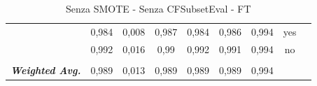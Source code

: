 \begin{table}[htbp]
{\begin{tabular}{rrrrrrrrr}
			\multicolumn{1}{c}{} & \multicolumn{1}{c}{0,984} & \multicolumn{1}{c}{0,008} & \multicolumn{1}{c}{0,987} & \multicolumn{1}{c}{0,984} & \multicolumn{1}{c}{0,986} & \multicolumn{1}{c}{0,994} & \multicolumn{1}{c}{yes} &  \\
			\multicolumn{1}{c}{} & \multicolumn{1}{c}{0,992} & \multicolumn{1}{c}{0,016} & \multicolumn{1}{c}{0,99} & \multicolumn{1}{c}{0,992} & \multicolumn{1}{c}{0,991} & \multicolumn{1}{c}{0,994} & \multicolumn{1}{c}{no} &  \\
			\multicolumn{1}{c}{} & \multicolumn{1}{c}{} & \multicolumn{1}{c}{} & \multicolumn{1}{c}{} & \multicolumn{1}{c}{} & \multicolumn{1}{c}{} & \multicolumn{1}{c}{} & \multicolumn{1}{c}{} &  \\
			\multicolumn{1}{c}{\textit{\textbf{Weighted Avg.}}} & \multicolumn{1}{c}{0,989} & \multicolumn{1}{c}{0,013} & \multicolumn{1}{c}{0,989} & \multicolumn{1}{c}{0,989} & \multicolumn{1}{c}{0,989} & \multicolumn{1}{c}{0,994} & \multicolumn{1}{c}{} &  \\
		\end{tabular}%
	}
	\label{tab:FT}%
	\caption{ Senza SMOTE - Senza CFSubsetEval - FT}
\end{table}%

